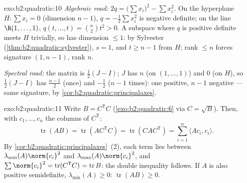 \begin{solution}{exo:b2:quadratic:10}
\emph{Algebraic road:} $2q = \bigl(\sum x_i\bigr)^2 - \sum
x_i^2$. On the hyperplane $H : \sum x_i = 0$ (dimension $n -
1$), $q = -\frac12\sum x_i^2$ is negative definite; on the line
$\R(1, \dots, 1)$, $q(t, \dots, t) = \binom n2 t^2 > 0$. A
subspace where $q$ is positive definite meets $H$ trivially, so
has dimension $\leq 1$: by Sylvester
(\cref{thm:b2:quadratic:sylvester}), $s = 1$, and $t \geq n-1$
from $H$; rank $\leq n$ forces signature $(1, n-1)$, rank $n$.

\emph{Spectral road:} the matrix is $\frac12(J - I)$; $J$ has
 $n$ (on $(1,\dots,1)$) and $0$ (on $H$), so
$\frac12(J-I)$ has  $\frac{n-1}{2}$ (once) and
$-\frac12$ ($n-1$ times): one positive, $n-1$ negative --- same
signature, by \cref{cor:b2:quadratic:principalaxes}.
\end{solution}

\begin{solution}{exo:b2:quadratic:11}
Write $B = C^{\mathsf T}C$ (\cref{exo:b2:quadratic:6} via $C =
\sqrt B$). Then, with $c_1, \dots, c_n$ the columns of
$C^{\mathsf T}$:
\[
\operatorname{tr}(AB) = \operatorname{tr}(AC^{\mathsf T}C)
= \operatorname{tr}(CAC^{\mathsf T})
= \sum_{i=1}^n \langle A c_i, c_i\rangle .
\]
By \cref{cor:b2:quadratic:principalaxes}~(2), each term lies
between $\lambda_{\min}(A)\norm{c_i}^2$ and
$\lambda_{\max}(A)\norm{c_i}^2$, and $\sum\norm{c_i}^2 =
\operatorname{tr}(C^{\mathsf T}C)^{\vphantom1} =
\operatorname{tr} B$: the double inequality follows. If $A$ is
also positive semidefinite, $\lambda_{\min}(A) \geq 0$:
$\operatorname{tr}(AB) \geq 0$.
\end{solution}

